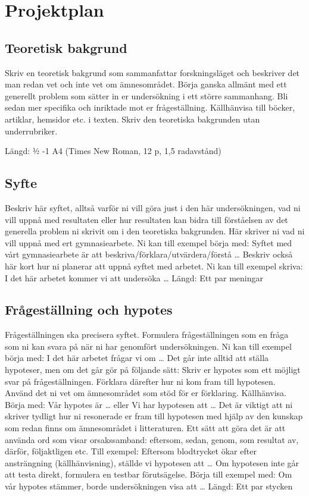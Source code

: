 \section{Projektplan}
\subsection{Teoretisk bakgrund}
Skriv en teoretisk bakgrund som sammanfattar forskningsläget och beskriver det man redan vet och inte vet om ämnesområdet. Börja ganska allmänt med ett generellt problem som sätter in er undersökning i ett större sammanhang. Bli sedan mer specifika och inriktade mot er frågeställning. Källhänvisa till böcker, artiklar, hemsidor etc. i texten. Skriv den teoretiska bakgrunden utan underrubriker.

Längd: ½ -1 A4 (Times New Roman, 12 p, 1,5 radavstånd)

\subsection{Syfte}
Beskriv här syftet, alltså varför ni vill göra just i den här undersökningen, vad ni vill uppnå med resultaten eller hur resultaten kan bidra till förståelsen av det generella problem ni skrivit om i den teoretiska bakgrunden. Här skriver ni vad ni vill uppnå med ert gymnasiearbete. Ni kan till exempel börja med: Syftet med vårt gymnasiearbete är att beskriva/förklara/utvärdera/förstå … Beskriv också här kort hur ni planerar att uppnå syftet med arbetet. Ni kan till exempel skriva: I det här arbetet kommer vi att undersöka …
Längd: Ett par meningar

\subsection{Frågeställning och hypotes}
Frågeställningen ska precisera syftet. Formulera frågeställningen som en fråga som ni kan svara på när ni har genomfört undersökningen. Ni kan till exempel börja med: I det här arbetet frågar vi om …
Det går inte alltid att ställa hypoteser, men om det går gör på följande sätt: Skriv er hypotes som ett möjligt svar på frågeställningen. Förklara därefter hur ni kom fram till hypotesen. Använd det ni vet om ämnesområdet som stöd för er förklaring. Källhänvisa. Börja med: Vår hypotes är … eller Vi har hypotesen att … Det är viktigt att ni skriver tydligt hur ni resonerade er fram till hypotesen med hjälp av den kunskap som redan finns om ämnesområdet i litteraturen. Ett sätt att göra det är att använda ord som visar orsakssamband: eftersom, sedan, genom, som resultat av, därför, följaktligen etc. Till exempel: Eftersom blodtrycket ökar efter ansträngning (källhänvisning), ställde vi hypotesen att … Om hypotesen inte går att testa direkt, formulera en testbar förutsägelse. Börja till exempel med: Om vår hypotes stämmer, borde undersökningen visa att …
Längd: Ett par stycken


